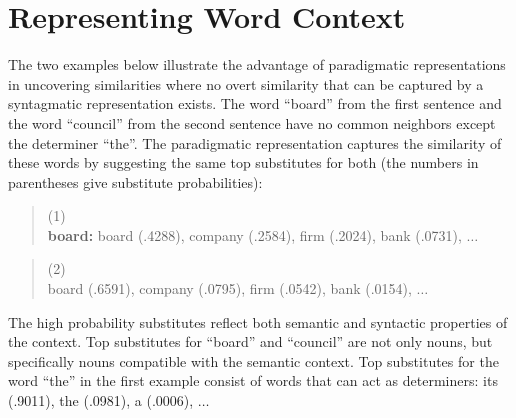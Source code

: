 \section{Representing Word Context}
\label{sec:representation}


The two examples below illustrate the advantage of paradigmatic
representations in uncovering similarities where no overt similarity
that can be captured by a syntagmatic representation exists.  The word
``board'' from the first sentence and the word ``council'' from the
second sentence have no common neighbors except the determiner
``the''.  The paradigmatic representation captures the similarity of
these words by suggesting the same top substitutes for both (the
numbers in parentheses give substitute probabilities):
\begin{quote}
 (1) \\
 {\bf board:} board (.4288), company (.2584), firm (.2024), bank (.0731), $\ldots$
\end{quote}

\begin{quote}
  (2) \\
  board (.6591), company (.0795), firm (.0542), bank (.0154), $\ldots$
\end{quote}

The high probability substitutes reflect both semantic and syntactic
properties of the context.  Top substitutes for ``board'' and
``council'' are not only nouns, but specifically nouns compatible with
the semantic context.  Top substitutes for the word ``the'' in the
first example consist of words that can act as determiners: its
(.9011), the (.0981), a (.0006), $\ldots$


